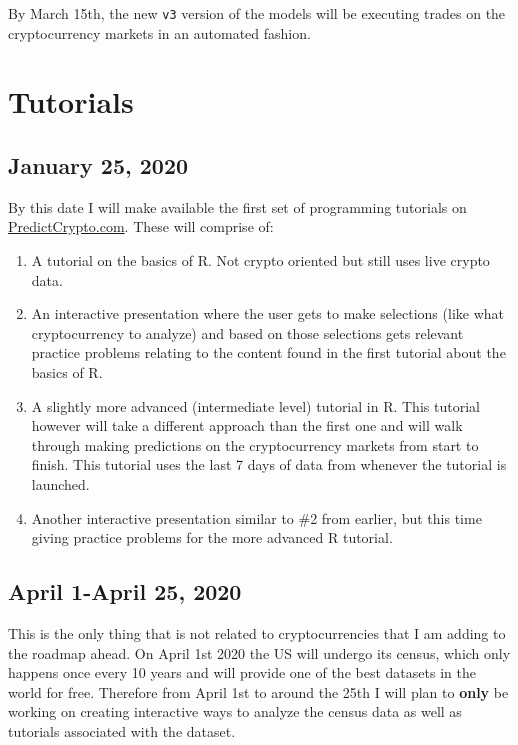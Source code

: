 \documentclass[
]{book}
\begin{document}
By March 15th, the new \texttt{v3} version of the models will be executing trades on the cryptocurrency markets in an automated fashion.

\hypertarget{tutorials}{%
\section{Tutorials}\label{tutorials}}

\hypertarget{january-25-2020}{%
\subsection{January 25, 2020}\label{january-25-2020}}

By this date I will make available the first set of programming tutorials on \href{https://www.predictcrypto.com/tutorials}{PredictCrypto.com}. These will comprise of:

\begin{enumerate}
\def\labelenumi{\arabic{enumi}.}
\item
  A tutorial on the basics of R. Not crypto oriented but still uses live crypto data.
\item
  An interactive presentation where the user gets to make selections (like what cryptocurrency to analyze) and based on those selections gets relevant practice problems relating to the content found in the first tutorial about the basics of R.
\item
  A slightly more advanced (intermediate level) tutorial in R. This tutorial however will take a different approach than the first one and will walk through making predictions on the cryptocurrency markets from start to finish. This tutorial uses the last 7 days of data from whenever the tutorial is launched.
\item
  Another interactive presentation similar to \#2 from earlier, but this time giving practice problems for the more advanced R tutorial.
\end{enumerate}

\hypertarget{april-1-april-25-2020}{%
\subsection{April 1-April 25, 2020}\label{april-1-april-25-2020}}

This is the only thing that is not related to cryptocurrencies that I am adding to the roadmap ahead. On April 1st 2020 the US will undergo its census, which only happens once every 10 years and will provide one of the best datasets in the world for free. Therefore from April 1st to around the 25th I will plan to \textbf{only} be working on creating interactive ways to analyze the census data as well as tutorials associated with the dataset.
\end{document}
